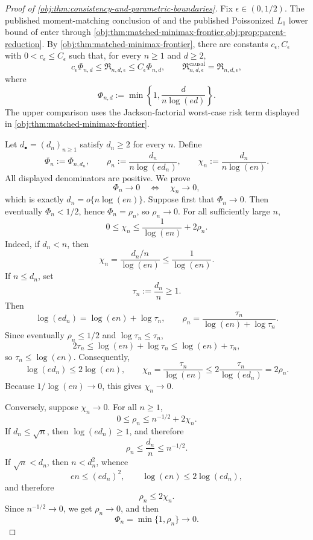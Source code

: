 \begin{proof}[Proof of \cref{obj:thm:consistency-and-parametric-boundaries}]
Fix \(\epsilon\in(0,1/2)\).  The published moment-matching conclusion of \citep[Lemma 1 and Section 3.1]{CaiLow2011L1} and the published Poissonized \(L_1\) lower bound of \citep[Theorem 3, equation (24)]{JiaoHanWeissman2018L1} enter through \cref{obj:thm:matched-minimax-frontier,obj:prop:parent-reduction}.  By \cref{obj:thm:matched-minimax-frontier}, there are constants \(c_\epsilon,C_\epsilon\) with \(0<c_\epsilon\le C_\epsilon\) such that, for every \(n\ge1\) and \(d\ge2\),
\[
c_\epsilon \Phi_{n,d}
\le
\mathfrak R_{n,d,\epsilon}
\le
C_\epsilon \Phi_{n,d},
\qquad
\mathfrak R^{\mathrm{causal}}_{n,d,\epsilon}
=
\mathfrak R_{n,d,\epsilon},
\]
where
\[
\Phi_{n,d}
:=
\min\left\{1,\frac{d}{n\log(ed)}\right\}.
\]
The upper comparison uses the Jackson-factorial worst-case risk term displayed in \cref{obj:thm:matched-minimax-frontier}. %

Let \(d_\bullet=(d_n)_{n\ge1}\) satisfy \(d_n\ge2\) for every \(n\).  Define
\[
\Phi_n:=\Phi_{n,d_n},
\qquad
\rho_n:=\frac{d_n}{n\log(ed_n)},
\qquad
\chi_n:=\frac{d_n}{n\log(en)}.
\]
All displayed denominators are positive.  We prove
\[
\Phi_n\to0
\quad\Longleftrightarrow\quad
\chi_n\to0,
\]
which is exactly \(d_n=o\{n\log(en)\}\).  Suppose first that \(\Phi_n\to0\).  Then eventually \(\Phi_n<1/2\), hence \(\Phi_n=\rho_n\), so \(\rho_n\to0\).  For all sufficiently large \(n\),
\[
0\le \chi_n\le \frac1{\log(en)}+2\rho_n .
\]
Indeed, if \(d_n<n\), then
\[
\chi_n=\frac{d_n/n}{\log(en)}
\le \frac1{\log(en)}.
\]
If \(n\le d_n\), set
\[
\tau_n:=\frac{d_n}{n}\ge1.
\]
Then
\[
\log(ed_n)=\log(en)+\log\tau_n,
\qquad
\rho_n=\frac{\tau_n}{\log(en)+\log\tau_n}.
\]
Since eventually \(\rho_n\le1/2\) and \(\log\tau_n\le\tau_n\),
\[
2\tau_n\le \log(en)+\log\tau_n\le \log(en)+\tau_n,
\]
so \(\tau_n\le\log(en)\).  Consequently,
\[
\log(ed_n)\le 2\log(en),
\qquad
\chi_n=\frac{\tau_n}{\log(en)}
\le
2\frac{\tau_n}{\log(ed_n)}
=
2\rho_n .
\]
Because \(1/\log(en)\to0\), this gives \(\chi_n\to0\).

Conversely, suppose \(\chi_n\to0\).  For all \(n\ge1\),
\[
0\le \rho_n\le n^{-1/2}+2\chi_n .
\]
If \(d_n\le\sqrt n\), then \(\log(ed_n)\ge1\), and therefore
\[
\rho_n\le\frac{d_n}{n}\le n^{-1/2}.
\]
If \(\sqrt n<d_n\), then \(n<d_n^2\), whence
\[
en\le (ed_n)^2,
\qquad
\log(en)\le2\log(ed_n),
\]
and therefore
\[
\rho_n\le2\chi_n .
\]
Since \(n^{-1/2}\to0\), we get \(\rho_n\to0\), and then
\[
\Phi_n=\min\{1,\rho_n\}\to0 .
\] %


\end{proof}

